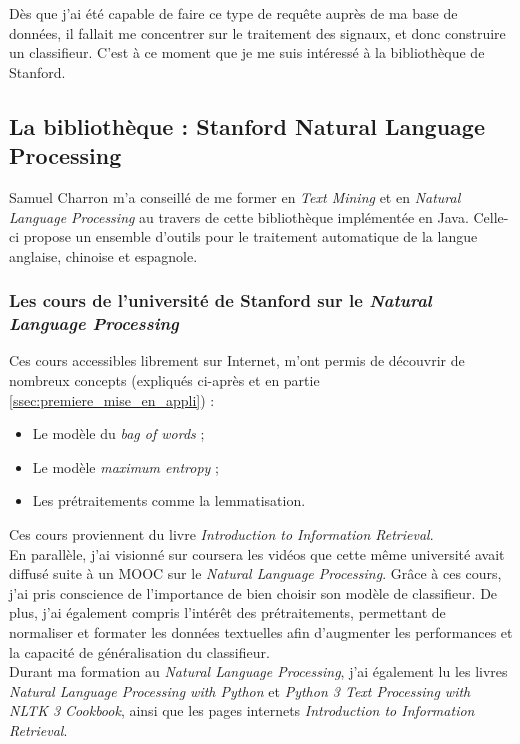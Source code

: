         Dès que j'ai été capable de faire ce type de requête auprès de ma base de données, il fallait me concentrer sur le traitement des signaux, et donc construire un classifieur. C'est à ce moment que je me suis intéressé à la bibliothèque de Stanford.

        \subsection{La bibliothèque : Stanford Natural Language Processing}
            Samuel Charron m'a conseillé de me former en \textit{Text Mining} et en \textit{Natural Language Processing} au travers de cette bibliothèque implémentée en Java. Celle-ci propose un ensemble d'outils pour le traitement automatique de la langue anglaise, chinoise et espagnole.

            \subsubsection{Les cours de l'université de Stanford sur le \textit{Natural Language Processing}}
                Ces cours accessibles librement sur Internet, m'ont permis de découvrir de nombreux concepts (expliqués ci-après et en partie \ref{ssec:premiere_mise_en_appli}) :
                \begin{itemize}
                    \item Le modèle du \textit{bag of words} ;
                    \item Le modèle \textit{maximum entropy} ;
                    \item Les prétraitements comme la lemmatisation.
                \end{itemize}
                Ces cours proviennent du livre \textit{Introduction to Information Retrieval}\autocite{ir_web}.\\

                En parallèle, j'ai visionné sur coursera les vidéos que cette même université avait diffusé suite à un MOOC sur le \textit{Natural Language Processing}. Grâce à ces cours, j'ai pris conscience de l'importance de bien choisir son modèle de classifieur. De plus, j'ai également compris l'intérêt des prétraitements, permettant de normaliser et formater les données textuelles afin d'augmenter les performances et la capacité de généralisation du classifieur.\\

                Durant ma formation au \textit{Natural Language Processing}, j'ai également lu les livres \textit{Natural Language Processing with Python}\autocite{nlp_p} et \textit{Python 3 Text Processing with NLTK 3 Cookbook}\autocite{nltk}, ainsi que les pages internets \textit{Introduction to Information Retrieval}\autocite{ir_web}.

